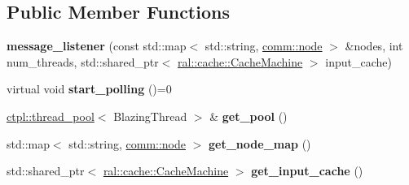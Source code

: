 \subsection*{Public Member Functions}
\begin{DoxyCompactItemize}
\item 
\mbox{\label{classcomm_1_1message__listener_abe358e40ea447e4e136a06723292a4b4}} 
{\bfseries message\+\_\+listener} (const std\+::map$<$ std\+::string, \hyperlink{classcomm_1_1node}{comm\+::node} $>$ \&nodes, int num\+\_\+threads, std\+::shared\+\_\+ptr$<$ \hyperlink{classral_1_1cache_1_1CacheMachine}{ral\+::cache\+::\+Cache\+Machine} $>$ input\+\_\+cache)
\item 
\mbox{\label{classcomm_1_1message__listener_ae9441738eec1d127db8e431e7e3d9408}} 
virtual void {\bfseries start\+\_\+polling} ()=0
\item 
\mbox{\label{classcomm_1_1message__listener_a8d3c1efd23d57d7aebe2afa3da5cacae}} 
\hyperlink{classctpl_1_1thread__pool}{ctpl\+::thread\+\_\+pool}$<$ Blazing\+Thread $>$ \& {\bfseries get\+\_\+pool} ()
\item 
\mbox{\label{classcomm_1_1message__listener_a8ebc28c2a76f06ffca9c1ea0762a5444}} 
std\+::map$<$ std\+::string, \hyperlink{classcomm_1_1node}{comm\+::node} $>$ {\bfseries get\+\_\+node\+\_\+map} ()
\item 
\mbox{\label{classcomm_1_1message__listener_ad295581719c46ec96282bfc927b492ea}} 
std\+::shared\+\_\+ptr$<$ \hyperlink{classral_1_1cache_1_1CacheMachine}{ral\+::cache\+::\+Cache\+Machine} $>$ {\bfseries get\+\_\+input\+\_\+cache} ()
\end{DoxyCompactItemize}
